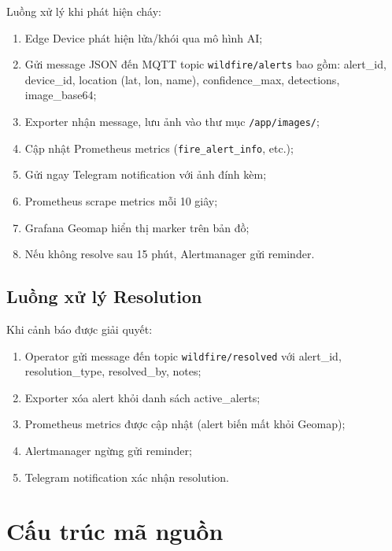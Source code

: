 \documentclass[12pt,a4paper]{report}
\begin{document}
Luồng xử lý khi phát hiện cháy:
\begin{enumerate}
  \item Edge Device phát hiện lửa/khói qua mô hình AI;
  \item Gửi message JSON đến MQTT topic \texttt{wildfire/alerts} bao gồm: alert\_id, device\_id, location (lat, lon, name), confidence\_max, detections, image\_base64;
  \item Exporter nhận message, lưu ảnh vào thư mục \texttt{/app/images/};
  \item Cập nhật Prometheus metrics (\texttt{fire\_alert\_info}, etc.);
  \item Gửi ngay Telegram notification với ảnh đính kèm;
  \item Prometheus scrape metrics mỗi 10 giây;
  \item Grafana Geomap hiển thị marker trên bản đồ;
  \item Nếu không resolve sau 15 phút, Alertmanager gửi reminder.
\end{enumerate}

\subsection{Luồng xử lý Resolution}

Khi cảnh báo được giải quyết:
\begin{enumerate}
  \item Operator gửi message đến topic \texttt{wildfire/resolved} với alert\_id, resolution\_type, resolved\_by, notes;
  \item Exporter xóa alert khỏi danh sách active\_alerts;
  \item Prometheus metrics được cập nhật (alert biến mất khỏi Geomap);
  \item Alertmanager ngừng gửi reminder;
  \item Telegram notification xác nhận resolution.
\end{enumerate}

\section{Cấu trúc mã nguồn}
\end{document}
